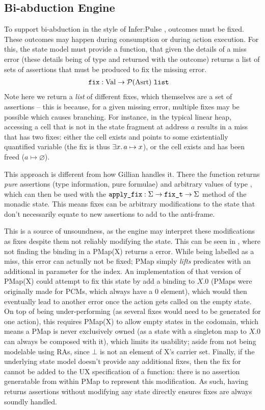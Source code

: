 \subsection{Bi-abduction Engine}

To support bi-abduction in the style of Infer:Pulse \cite{pulse}, \Miss{} outcomes must be fixed. These outcomes may happen during consumption or during action execution. For this, the state model must provide a \fix{} function, that given the details of a miss error (these details being of type \Val{} and returned with the outcome) returns a list of sets of assertions that must be produced to fix the missing error.
\begin{align*}
	\texttt{fix} &: \text{Val} \rightarrow {\cal P}(\text{Asrt}) ~\texttt{list}
\end{align*}
Note here we return a \emph{list} of different fixes, which themselves are a set of assertions -- this is because, for a given missing error, multiple fixes may be possible which causes branching. For instance, in the typical linear heap, accessing a cell that is not in the state fragment at address $a$ results in a miss that has two fixes: either the cell exists and points to some existentially quantified variable (the fix is thus $\exists x\ldotp a \mapsto x$), or the cell exists and has been freed ($a\mapsto\varnothing$).

This approach is different from how Gillian handles it. There the function \fix{} returns \emph{pure} assertions (type information, pure formulae) and arbitrary values of type , which can then be used with the $\texttt{apply\_fix}:\Sigma \rightarrow \texttt{fix\_t} \rightarrow \Sigma$ method of the monadic state. This means fixes can be arbitrary modifications to the state that don't necessarily equate to new assertions to add to the anti-frame.

This is a source of unsoundness, as the engine may interpret these modifications as fixes despite them not reliably modifying the state. This can be seen in \cite{sacha-phd}, where not finding the binding in a PMap(X) returns a  error. While being labelled as a miss, this error can actually not be fixed; PMap simply \emph{lifts} predicates with an additional in parameter for the index. An implementation of that version of PMap(X) could attempt to fix this state by add a binding to $X.0$ (PMaps were originally made for PCMs, which always have a 0 element), which would then eventually lead to another error once the action gets called on the empty state. On top of being under-performing (as several fixes would need to be generated for one action), this requires PMap(X) to allow empty states in the codomain, which means a PMap is never exclusively owned (as a state with a singleton map to $X.0$ can always be composed with it), which limits its usability; aside from not being modelable using RAs, since $\bot$ is not an element of X's carrier set. Finally, if the underlying state model doesn't provide any additional fixes, then the fix for  cannot be added to the UX specification of a function: there is no assertion generatable from within PMap to represent this modification. As such, having \fix{} returns assertions without modifying any state directly ensures fixes are always soundly handled.

